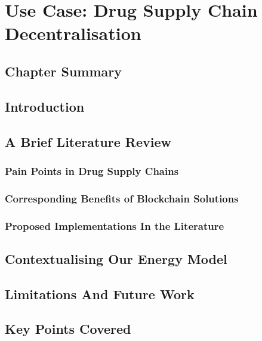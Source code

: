 \chapter{Use Case: Drug Supply Chain Decentralisation}
\section{Chapter Summary}
\section{Introduction}
\section{A Brief Literature Review}
\subsection{Pain Points in Drug Supply Chains}
\subsection{Corresponding Benefits of Blockchain Solutions}
\subsection{Proposed Implementations In the Literature}
\section{Contextualising Our Energy Model}
\section{Limitations And Future Work}
\section{Key Points Covered}

